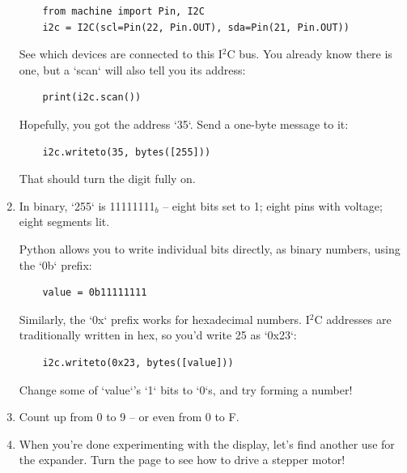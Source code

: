 \documentclass{../tutorial}
\begin{document}
\begin{enumerate}
    \begin{lstlisting}
    from machine import Pin, I2C
    i2c = I2C(scl=Pin(22, Pin.OUT), sda=Pin(21, Pin.OUT))
    \end{lstlisting}

    See which devices are connected to this I$^2$C bus.
    You already know there is one, but a `scan` will also tell you its address:

    \begin{lstlisting}
    print(i2c.scan())
    \end{lstlisting}

    Hopefully, you got the address `35`.
    Send a one-byte message to it:

    \begin{lstlisting}
    i2c.writeto(35, bytes([255]))
    \end{lstlisting}

    That should turn the digit fully on.

\item
    In binary, `255` is 11111111$_b$ – eight bits set to 1;
    eight pins with voltage; eight segments lit.

    Python allows you to write individual bits directly, as binary numbers,
    using the `0b` prefix:

    \begin{lstlisting}
    value = 0b11111111
    \end{lstlisting}

    Similarly, the `0x` prefix works for hexadecimal numbers.
    I$^2$C addresses are traditionally written in hex, so you'd write 25 as
    `0x23`:

    \begin{lstlisting}
    i2c.writeto(0x23, bytes([value]))
    \end{lstlisting}

    Change some of `value`'s `1` bits to `0`s, and try forming a number!

\item
    Count up from 0 to 9 – or even from 0 to F.

\item
    When you're done experimenting with the display,
    let's find another use for the expander.
    Turn the page to see how to drive a stepper motor!


\end{enumerate}
\end{document}
